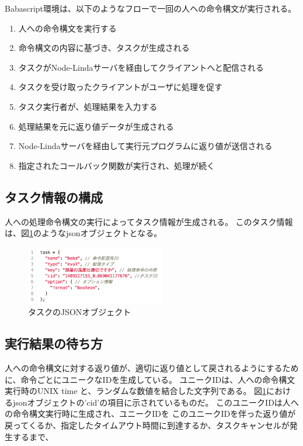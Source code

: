 Babascript環境は、以下のようなフローで一回の人への命令構文が実行される。

\begin{enumerate}
\def\labelenumi{\arabic{enumi}.}
\itemsep1pt\parskip0pt
\item
  人への命令構文を実行する
\item
  命令構文の内容に基づき、タスクが生成される
\item
  タスクがNode-Lindaサーバを経由してクライアントへと配信される
\item
  タスクを受け取ったクライアントがユーザに処理を促す
\item
  タスク実行者が、処理結果を入力する
\item
  処理結果を元に返り値データが生成される
\item
  Node-Lindaサーバを経由して実行元プログラムに返り値が送信される
\item
  指定されたコールバック関数が実行され、処理が続く
\end{enumerate}

\subsection{タスク情報の構成}\label{ux30bfux30b9ux30afux60c5ux5831ux306eux69cbux6210}

人への処理命令構文の実行によってタスク情報が生成される。
このタスク情報は、図\ref{task}のようなjsonオブジェクトとなる。

\begin{figure}[h]
  \includegraphics[width=230px]{./images/task.png}
  \caption{タスクのJSONオブジェクト}  
  \label{task}
\end{figure}

\subsection{実行結果の待ち方}\label{ux5b9fux884cux7d50ux679cux306eux5f85ux3061ux65b9}

人への命令構文に対する返り値が、適切に返り値として戻されるようにするために、命令ごとにユニークなIDを生成している。
ユニークIDは、人への命令構文実行時のUNIX time
と、ランダムな数値を結合した文字列である。
図\ref{task}におけるjsonオブジェクトの'cid'の項目に示されているものだ。
このユニークIDは人への命令構文実行時に生成され、ユニークIDを
このユニークIDを伴った返り値が戻ってくるか、指定したタイムアウト時間に到達するか、タスクキャンセルが発生するまで、

